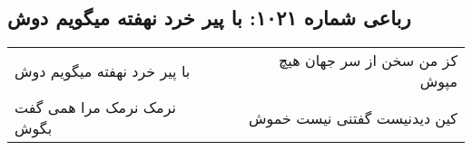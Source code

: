 \begin{center}
\section*{رباعی شماره ۱۰۲۱: با پیر خرد نهفته میگویم دوش}
\label{sec:1021}
\begin{longtable}{l p{0.5cm} r}
با پیر خرد نهفته میگویم دوش
&&
کز من سخن از سر جهان هیچ مپوش
\\
نرمک نرمک مرا همی گفت بگوش
&&
کین دیدنیست گفتنی نیست خموش
\\
\end{longtable}
\end{center}
